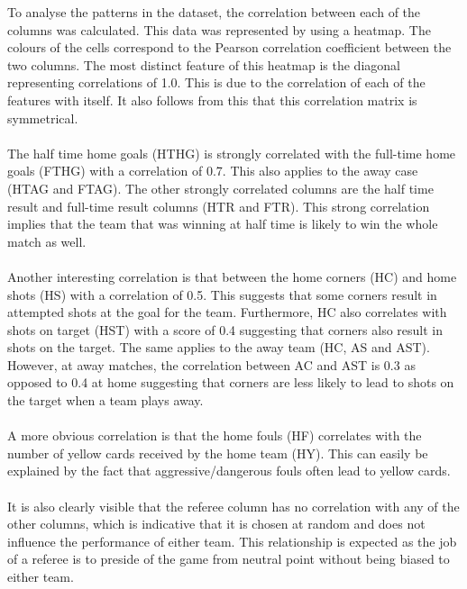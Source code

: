 \documentclass[a4paper,12pt]{article}
\begin{document}
	To analyse the patterns in the dataset, the correlation between each of the columns was calculated. This data was represented by using a heatmap. The colours of the cells correspond to the Pearson correlation coefficient between the two columns. The most distinct feature of this heatmap is the diagonal representing correlations of 1.0. This is due to the correlation of each of the features with itself. It also follows from this that this correlation matrix is symmetrical. \\
	\\
	The half time home goals (HTHG) is strongly correlated with the full-time home goals (FTHG) with a correlation of 0.7. This also applies to the away case (HTAG and FTAG). The other strongly correlated columns are the half time result and full-time result columns (HTR and FTR). This strong correlation implies that the team that was winning at half time is likely to win the whole match as well.\\
	\\
	Another interesting correlation is that between the home corners (HC) and home shots (HS) with a correlation of 0.5. This suggests that some corners result in attempted shots at the goal for the team. Furthermore, HC also correlates with shots on target (HST) with a score of 0.4 suggesting that corners also result in shots on the target. The same applies to the away team (HC, AS and AST). However, at away matches, the correlation between AC and AST is 0.3 as opposed to 0.4 at home suggesting that corners are less likely to lead to shots on the target when a team plays away. \\
	\\
	A more obvious correlation is that the home fouls (HF) correlates with the number of yellow cards received by the home team (HY). This can easily be explained by the fact that aggressive/dangerous fouls often lead to yellow cards. \\
	\\
	It is also clearly visible that the referee column has no correlation with any of the other columns, which is indicative that it is chosen at random and does not influence the performance of either team. This relationship is expected as the job of a referee is to preside of the game from neutral point without being biased to either team.
	
\end{document}
